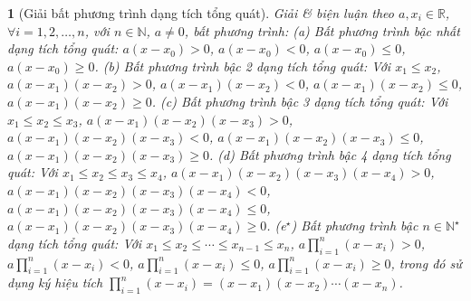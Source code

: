 \documentclass{article}
\newtheorem{baitoan}{}%
\begin{document}
\begin{baitoan}[Giải bất phương trình dạng tích tổng quát]
	Giải \& biện luận theo $a,x_i\in\mathbb{R}$, $\forall i = 1,2,\ldots,n$, với $n\in\mathbb{N}$, $a\ne0$, bất phương trình: (a) {\rm Bất phương trình bậc nhất dạng tích tổng quát:} $a(x - x_0) > 0$, $a(x - x_0) < 0$, $a(x - x_0)\le0$, $a(x - x_0)\ge0$. (b) {\rm Bất phương trình bậc 2 dạng tích tổng quát:} Với $x_1\le x_2$, $a(x - x_1)(x - x_2) > 0$, $a(x - x_1)(x - x_2) < 0$, $a(x - x_1)(x - x_2)\le0$, $a(x - x_1)(x - x_2)\ge0$. (c) {\rm Bất phương trình bậc 3 dạng tích tổng quát:} Với $x_1\le x_2\le x_3$, $a(x - x_1)(x - x_2)(x - x_3) > 0$, $a(x - x_1)(x - x_2)(x - x_3) < 0$, $a(x - x_1)(x - x_2)(x - x_3)\le0$, $a(x - x_1)(x - x_2)(x - x_3)\ge0$. (d) {\rm Bất phương trình bậc 4 dạng tích tổng quát:} Với $x_1\le x_2\le x_3\le x_4$, $a(x - x_1)(x - x_2)(x - x_3)(x - x_4) > 0$, $a(x - x_1)(x - x_2)(x - x_3)(x - x_4) < 0$, $a(x - x_1)(x - x_2)(x - x_3)(x - x_4)\le0$, $a(x - x_1)(x - x_2)(x - x_3)(x - x_4)\ge0$. (e${}^\star$) {\rm Bất phương trình bậc $n\in\mathbb{N}^\star$ dạng tích tổng quát:} Với $x_1\le x_2\le\cdots\le x_{n-1}\le x_n$, $a\prod_{i=1}^n (x - x_i) > 0$, $a\prod_{i=1}^n (x - x_i) < 0$, $a\prod_{i=1}^n (x - x_i)\le0$, $a\prod_{i=1}^n (x - x_i)\ge0$, trong đó sử dụng ký hiệu tích $\prod_{i=1}^n (x - x_i) = (x - x_1)(x - x_2)\cdots(x - x_n)$.
\end{baitoan}
\end{document}
